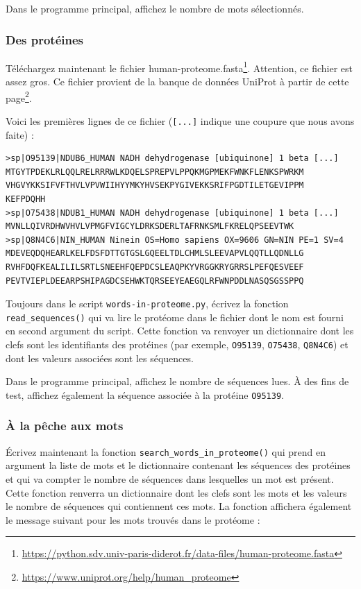 \documentclass[a4paper,11pt,twoside]{book}
\renewcommand{\href}[2]{#2\footnote{\url{#1}}}
\begin{document}
Dans le programme principal, affichez le nombre de mots sélectionnés.

\subsubsection{Des protéines}\label{des-protuxe9ines}

Téléchargez maintenant le fichier
\href{https://python.sdv.univ-paris-diderot.fr/data-files/human-proteome.fasta}{human-proteome.fasta}.
Attention, ce fichier est assez gros. Ce fichier provient de la banque
de données UniProt à partir de cette
\href{https://www.uniprot.org/help/human_proteome}{page}.

Voici les premières lignes de ce fichier (\texttt{{[}...{]}} indique une
coupure que nous avons faite) :

\begin{verbatim}
>sp|O95139|NDUB6_HUMAN NADH dehydrogenase [ubiquinone] 1 beta [...]
MTGYTPDEKLRLQQLRELRRRWLKDQELSPREPVLPPQKMGPMEKFWNKFLENKSPWRKM
VHGVYKKSIFVFTHVLVPVWIIHYYMKYHVSEKPYGIVEKKSRIFPGDTILETGEVIPPM
KEFPDQHH
>sp|O75438|NDUB1_HUMAN NADH dehydrogenase [ubiquinone] 1 beta [...]
MVNLLQIVRDHWVHVLVPMGFVIGCYLDRKSDERLTAFRNKSMLFKRELQPSEEVTWK
>sp|Q8N4C6|NIN_HUMAN Ninein OS=Homo sapiens OX=9606 GN=NIN PE=1 SV=4
MDEVEQDQHEARLKELFDSFDTTGTGSLGQEELTDLCHMLSLEEVAPVLQQTLLQDNLLG
RVHFDQFKEALILILSRTLSNEEHFQEPDCSLEAQPKYVRGGKRYGRRSLPEFQESVEEF
PEVTVIEPLDEEARPSHIPAGDCSEHWKTQRSEEYEAEGQLRFWNPDDLNASQSGSSPPQ
\end{verbatim}

Toujours dans le script \texttt{words-in-proteome.py}, écrivez la
fonction \texttt{read\_sequences()} qui va lire le protéome dans le
fichier dont le nom est fourni en second argument du script. Cette
fonction va renvoyer un dictionnaire dont les clefs sont les
identifiants des protéines (par exemple, \texttt{O95139},
\texttt{O75438}, \texttt{Q8N4C6}) et dont les valeurs associées sont les
séquences.

Dans le programme principal, affichez le nombre de séquences lues. À des
fins de test, affichez également la séquence associée à la protéine
\texttt{O95139}.

\subsubsection{À la pêche aux mots}\label{uxe0-la-puxeache-aux-mots}

Écrivez maintenant la fonction \texttt{search\_words\_in\_proteome()}
qui prend en argument la liste de mots et le dictionnaire contenant les
séquences des protéines et qui va compter le nombre de séquences dans
lesquelles un mot est présent. Cette fonction renverra un dictionnaire
dont les clefs sont les mots et les valeurs le nombre de séquences qui
contiennent ces mots. La fonction affichera également le message suivant
pour les mots trouvés dans le protéome :
\end{document}
